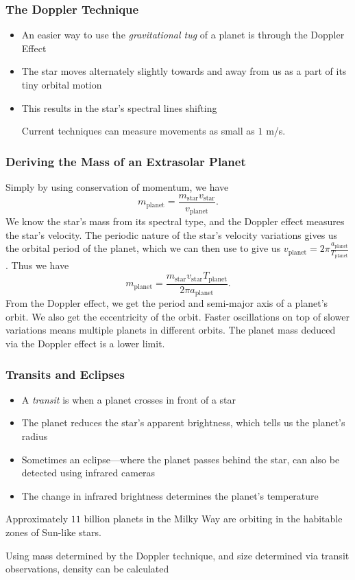 \documentclass[class=article, crop=false]{standalone}
\begin{document}
  \subsubsection{The Doppler Technique}
  \begin{itemize}
    \item An easier way to use the \emph{gravitational tug} of a planet is through the Doppler Effect
    \item The star moves alternately slightly towards and away from us as a part of its tiny orbital motion
    \item This results in the star's spectral lines shifting
    \begin{note}{}
      Current techniques can measure movements as small as $1$ m/s.
    \end{note}
  \end{itemize}
  \subsubsection{Deriving the Mass of an Extrasolar Planet}
  Simply by using conservation of momentum, we have
  \[
    m_\text{planet} = \frac{m_\text{star}v_\text{star}}{v_\text{planet}}.
  \]
  We know the star's mass from its spectral type, and the Doppler effect measures the star's velocity. The periodic nature of the star's velocity variations gives us the orbital period of the planet, which we can then use to give us $v_\text{planet} = 2\pi \frac{a_\text{planet}}{T_\text{planet}}$. Thus we have
  \[
    m_\text{planet} = \frac{m_\text{star}v_\text{star}T_\text{planet}}{2\pi a_\text{planet}}.
  \]
  From the Doppler effect, we get the period and semi-major axis of a planet's orbit. We also get the eccentricity of the orbit. Faster oscillations on top of slower variations means multiple planets in different orbits. The planet mass deduced via the Doppler effect is a lower limit.
  \subsubsection{Transits and Eclipses}
  \begin{itemize}
    \item A \emph{transit} is when a planet crosses in front of a star
    \item The planet reduces the star's apparent brightness, which tells us the planet's radius
    \item Sometimes an eclipse---where the planet passes behind the star, can also be detected using infrared cameras
    \item The change in infrared brightness determines the planet's temperature
  \end{itemize}
  Approximately $11$ billion planets in the Milky Way are orbiting in the habitable zones of Sun-like stars. \par
  Using mass determined by the Doppler technique, and size determined via transit observations, density can be calculated
\end{document}
